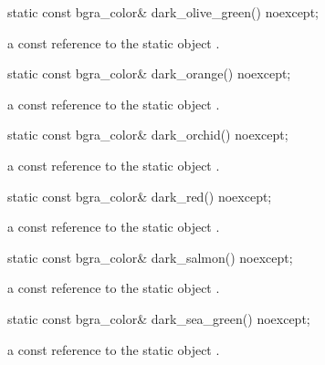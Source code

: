 \begin{itemdecl}
static const bgra_color& dark_olive_green() noexcept;
\end{itemdecl}
\begin{itemdescr}
\pnum
\returns
a const reference to the static  object .
\end{itemdescr}

\begin{itemdecl}
static const bgra_color& dark_orange() noexcept;
\end{itemdecl}
\begin{itemdescr}
\pnum
\returns
a const reference to the static  object .
\end{itemdescr}

\begin{itemdecl}
static const bgra_color& dark_orchid() noexcept;
\end{itemdecl}
\begin{itemdescr}
\pnum
\returns
a const reference to the static  object .
\end{itemdescr}

\begin{itemdecl}
static const bgra_color& dark_red() noexcept;
\end{itemdecl}
\begin{itemdescr}
\pnum
\returns
a const reference to the static  object .
\end{itemdescr}

\begin{itemdecl}
static const bgra_color& dark_salmon() noexcept;
\end{itemdecl}
\begin{itemdescr}
\pnum
\returns
a const reference to the static  object .
\end{itemdescr}

\begin{itemdecl}
static const bgra_color& dark_sea_green() noexcept;
\end{itemdecl}
\begin{itemdescr}
\pnum
\returns
a const reference to the static  object .
\end{itemdescr}

